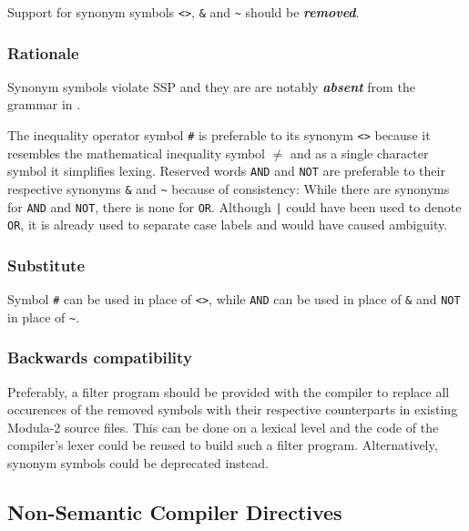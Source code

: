 \documentclass[10pt,a4paper]{article}
\renewcommand{\emph}[1]{\textbf{\textit{#1}}}
\begin{document}
Support for synonym symbols \verb|<>|, \verb|&| and \verb|~| should be
\emph{removed}.

\subsubsection{Rationale}

Synonym symbols violate SSP and they are are notably \emph{absent} from the
grammar in \cite{Wirth88}.

The inequality operator symbol \verb|#| is preferable to its synonym \verb|<>|
because it resembles the mathematical inequality symbol $\neq$ and as a single
character symbol it simplifies lexing. Reserved words \verb|AND| and \verb|NOT|
are preferable to their respective synonyms \verb|&| and \verb|~| because of
consistency: While there are synonyms for \verb|AND| and \verb|NOT|, there is
none for \verb|OR|. Although \verb!|! could have been used to denote \verb|OR|,
it is already used to separate case labels and would have caused ambiguity.

\subsubsection{Substitute}

Symbol \verb|#| can be used in place of \verb|<>|, while \verb|AND| can be used
in place of \verb|&| and \verb|NOT| in place of \verb|~|.

\subsubsection{Backwards compatibility}

Preferably, a filter program should be provided with the compiler to replace
all occurences of the removed symbols with their respective counterparts in
existing Modula-2 source files. This can be done on a lexical level and the
code of the compiler's lexer could be reused to build such a filter program.
Alternatively, synonym symbols could be deprecated instead.


\subsection{Non-Semantic Compiler Directives}
\end{document}
